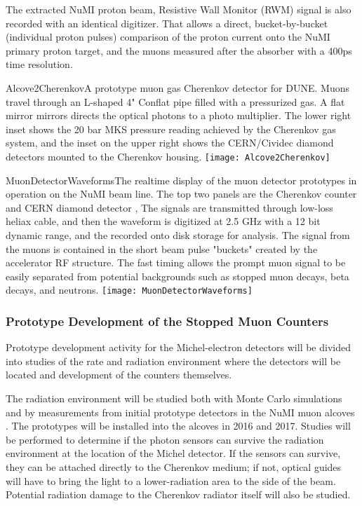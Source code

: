 The extracted NuMI proton beam, Resistive Wall Monitor (RWM) signal 
is also recorded with an identical digitizer. That allows a direct, bucket-by-bucket (individual proton pulses) 
comparison of the proton current onto the NuMI primary proton target, and the muons measured after the absorber with a 400ps time resolution.

\begin{cdrfigure}{Alcove2Cherenkov}{A prototype muon gas Cherenkov detector for DUNE.  
Muons travel through an L-shaped 4" Conflat pipe filled with a pressurized gas. A flat mirror mirrors directs the optical photons to a photo multiplier. The lower right inset shows the 20 bar MKS pressure reading achieved by the Cherenkov gas system, and the inset on the upper right shows the CERN/Cividec diamond detectors mounted to the Cherenkov housing.}
\texttt{[image: Alcove2Cherenkov]}
\end{cdrfigure}

\begin{cdrfigure}{MuonDetectorWaveforms}{The realtime display of the
muon detector prototypes in operation on the NuMI beam line. The top two panels are the Cherenkov counter and CERN diamond detector \cite{ref:CERNdiamond}, The signals are transmitted through low-loss heliax cable, and then the waveform is digitized at 2.5 GHz with a 12 bit dynamic range, and the recorded onto disk storage for analysis. The signal from the muons is contained in the short beam pulse "buckets" created by the accelerator RF structure. The fast timing allows the prompt muon signal to be easily separated from potential backgrounds such as stopped muon decays, beta decays, and neutrons.}
\texttt{[image: MuonDetectorWaveforms]}
\end{cdrfigure}

\subsubsection{Prototype Development of the Stopped Muon Counters}

Prototype development activity for the Michel-electron detectors will
be divided into studies of the rate and radiation environment where
the detectors will be located and development of the counters
themselves. 

The radiation environment will be studied both with Monte Carlo 
simulations and by measurements from initial prototype detectors 
in the NuMI muon alcoves \cite{ref:NuMIBeamMonitors}.
The prototypes will be installed into the alcoves in 2016 and 2017.
Studies will be performed to determine if the photon sensors
can survive the radiation environment at the location of the Michel
detector. If the sensors can survive, they can be attached directly to
the Cherenkov medium; if not, optical guides will have to bring the
light to a lower-radiation area to the side of the beam. Potential
radiation damage to the Cherenkov radiator itself will also be
studied.

